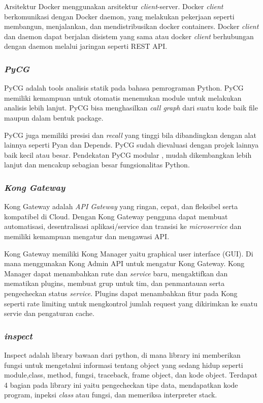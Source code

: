 Arsitektur Docker menggunakan arsitektur \textit{client}-server. Docker \textit{client} berkomunikasi dengan Docker daemon, yang melakukan pekerjaan seperti membangun, menjalankan, dan mendistribusikan docker containers. Docker \textit{client} dan daemon dapat berjalan disistem yang sama atau docker \textit{client} berhubungan dengan daemon melalui jaringan seperti REST API. 
\\
\subsubsection{\textit{PyCG} \cite{AD7}}
PyCG adalah tools analisis statik pada bahasa pemrograman Python. PyCG memiliki kemampuan untuk otomatis menemukan module untuk melakukan analisis lebih lanjut. PyCG bisa menghasilkan \textit{call graph} dari suatu kode baik file maupun dalam bentuk package.

PyCG juga memiliki presisi dan \textit{recall} yang tinggi bila dibandingkan dengan alat lainnya seperti Pyan dan Depends. PyCG sudah dievaluasi dengan projek lainnya baik kecil atau besar. Pendekatan PyCG modular , mudah dikembangkan lebih lanjut dan mencakup sebagian besar fungsionalitas Python.
\\
\subsubsection{\textit{Kong Gateway} \cite{kong}}
Kong Gateway adalah \textit{API Gateway} yang ringan, cepat, dan fleksibel serta kompatibel di Cloud. Dengan Kong Gateway pengguna dapat membuat automatisasi, desentralisasi aplikasi/service dan transisi ke \textit{microservice} dan memiliki kemampuan mengatur dan mengawasi API.

Kong Gateway memiliki Kong Manager yaitu graphical user interface (GUI). Di mana menggunakan Kong Admin API untuk mengatur Kong Gateway. Kong Manager dapat menambahkan rute dan \textit{service} baru, mengaktifkan dan mematikan plugins, membuat grup untuk tim, dan penmantauan serta pengecheckan status \textit{service}. Plugins dapat menambahkan fitur pada Kong seperti rate limiting untuk mengkontrol jumlah request yang dikirimkan ke suatu servie dan pengaturan cache.
\\
\subsubsection{\textit{inspect} \cite{inspect}}
Inspect adalah library bawaan dari python, di mana library ini memberikan fungsi untuk mengetahui informasi tentang object yang sedang hidup seperti module,class, method, fungsi, traceback, frame object, dan kode object. Terdapat 4 bagian pada library ini yaitu pengecheckan tipe data, mendapatkan kode program, inpeksi \textit{class} atau fungsi, dan memeriksa interpreter stack.

